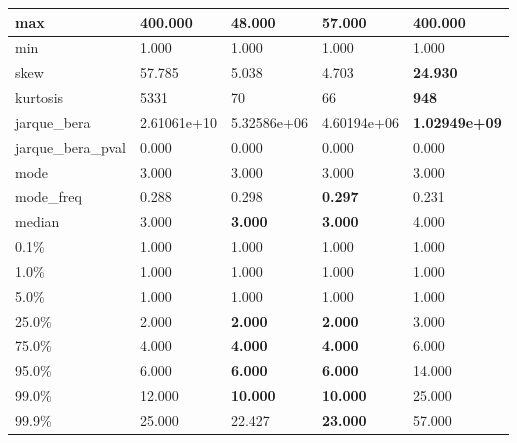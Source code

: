\begin{table}[H]
\begin{tabular}{|l|m{10em}|m{10em}|m{10em}|m{10em}|}
\hline max & 400.000 & \cellcolor[rgb]{0.9, 0.54, 0.52} 48.000 & 57.000 & \bfseries 400.000 \\
\hline min & 1.000 & 1.000 & 1.000 & 1.000 \\
\hline skew & 57.785 & 5.038 & \cellcolor[rgb]{0.9, 0.54, 0.52} 4.703 & \bfseries 24.930 \\
\hline kurtosis & 5331 & 70 & \cellcolor[rgb]{0.9, 0.54, 0.52} 66 & \bfseries 948 \\
\hline jarque\_bera & 2.61061e+10 & 5.32586e+06 & \cellcolor[rgb]{0.9, 0.54, 0.52} 4.60194e+06 & \bfseries 1.02949e+09 \\
\hline jarque\_bera\_pval & 0.000 & 0.000 & 0.000 & 0.000 \\
\hline mode & 3.000 & 3.000 & 3.000 & 3.000 \\
\hline mode\_freq & 0.288 & 0.298 & \bfseries 0.297 & \cellcolor[rgb]{0.9, 0.54, 0.52} 0.231 \\
\hline median & 3.000 & \bfseries 3.000 & \bfseries 3.000 & \cellcolor[rgb]{0.9, 0.54, 0.52} 4.000 \\
\hline 0.1\% & 1.000 & 1.000 & 1.000 & 1.000 \\
\hline 1.0\% & 1.000 & 1.000 & 1.000 & 1.000 \\
\hline 5.0\% & 1.000 & 1.000 & 1.000 & 1.000 \\
\hline 25.0\% & 2.000 & \bfseries 2.000 & \bfseries 2.000 & \cellcolor[rgb]{0.9, 0.54, 0.52} 3.000 \\
\hline 75.0\% & 4.000 & \bfseries 4.000 & \bfseries 4.000 & \cellcolor[rgb]{0.9, 0.54, 0.52} 6.000 \\
\hline 95.0\% & 6.000 & \bfseries 6.000 & \bfseries 6.000 & \cellcolor[rgb]{0.9, 0.54, 0.52} 14.000 \\
\hline 99.0\% & 12.000 & \bfseries 10.000 & \bfseries 10.000 & \cellcolor[rgb]{0.9, 0.54, 0.52} 25.000 \\
\hline 99.9\% & 25.000 & 22.427 & \bfseries 23.000 & \cellcolor[rgb]{0.9, 0.54, 0.52} 57.000 \\
\hline
\end{tabular}
\end{table}
